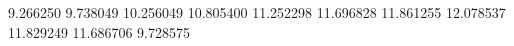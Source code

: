 9.266250
9.738049
10.256049
10.805400
11.252298
11.696828
11.861255
12.078537
11.829249
11.686706
9.728575
